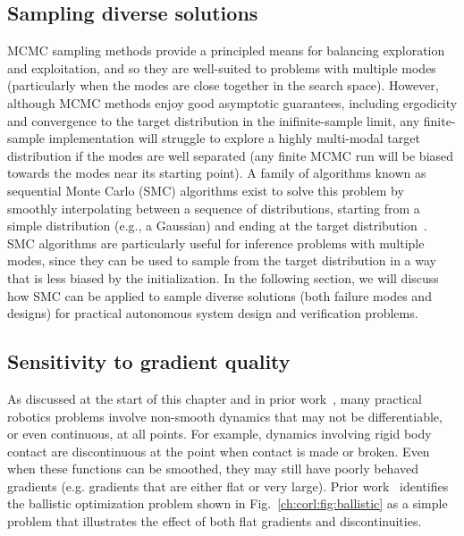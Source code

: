 \subsection{Sampling diverse solutions}

MCMC sampling methods provide a principled means for balancing exploration and exploitation, and so they are well-suited to problems with multiple modes (particularly when the modes are close together in the search space). However, although MCMC methods enjoy good asymptotic guarantees, including ergodicity and convergence to the target distribution in the inifinite-sample limit, any finite-sample implementation will struggle to explore a highly multi-modal target distribution if the modes are well separated (any finite MCMC run will be biased towards the modes near its starting point). A family of algorithms known as sequential Monte Carlo (SMC) algorithms exist to solve this problem by smoothly interpolating between a sequence of distributions, starting from a simple distribution (e.g., a Gaussian) and ending at the target distribution~\cite{chopinIntroductionSequentialMonte2020}. SMC algorithms are particularly useful for inference problems with multiple modes, since they can be used to sample from the target distribution in a way that is less biased by the initialization. In the following section, we will discuss how SMC can be applied to sample diverse solutions (both failure modes and designs) for practical autonomous system design and verification problems.

\subsection{Sensitivity to gradient quality}%

As discussed at the start of this chapter and in prior work~\cite{suhDifferentiableSimulatorsGive2022,suh2021_bundled_gradients}, many practical robotics problems involve non-smooth dynamics that may not be differentiable, or even continuous, at all points. For example, dynamics involving rigid body contact are discontinuous at the point when contact is made or broken. Even when these functions can be smoothed, they may still have poorly behaved gradients (e.g. gradients that are either flat or very large). Prior work~\cite{suhDifferentiableSimulatorsGive2022} identifies the ballistic optimization problem shown in Fig.~\ref{ch:corl:fig:ballistic} as a simple problem that illustrates the effect of both flat gradients and discontinuities.


